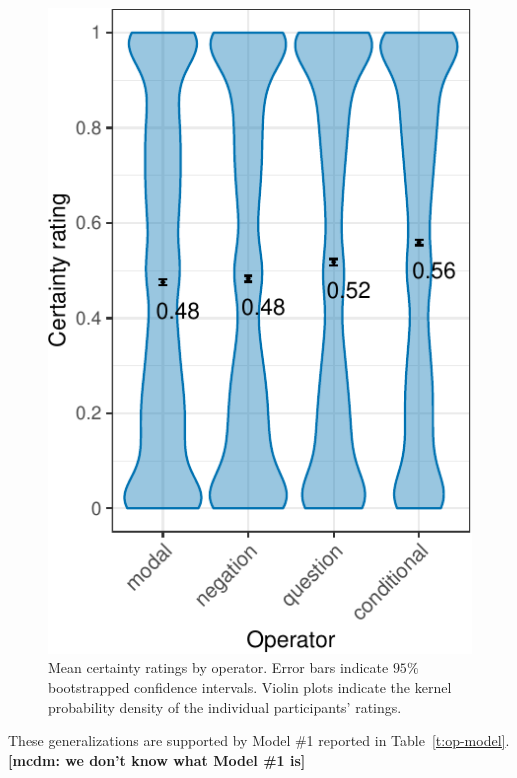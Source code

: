 \documentclass[a4paper,12pt,twoside]{article}
\newcommand{\mcdm}[1]{\textbf{\color{blue}[mcdm: #1]}}
\begin{document}

			\begin{figure}[ht]
				\centering
				\includegraphics[scale = .8]{operator-graph-1}
				\caption{Mean certainty ratings by operator. Error bars indicate $95\%$ bootstrapped confidence intervals. Violin plots indicate the kernel probability density of the individual participants’ ratings.}
				\label{fig:op-ratings}
			\end{figure}

   
   These generalizations are supported by Model \#1 reported in Table~\ref{t:op-model}.\mcdm{we don't know what Model \#1 is}
\end{document}
